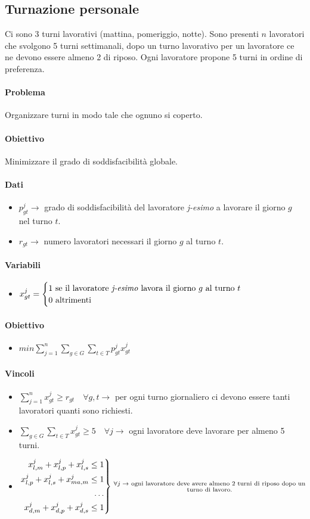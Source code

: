 \documentclass[12pt, twoside, letterpaper]{article}
\newenvironment{rcases}
  {\left.\begin{aligned}}
  {\end{aligned}\right\rbrace}
\newcommand{\problemai}[5]{
	#1
	\begin{dati}
		\paragraph{Dati} 
			\begin{itemize}
				#2
			\end{itemize}
	\end{dati}
	\begin{variabili}
		\paragraph{Variabili} 
			\begin{itemize}
				#3
			\end{itemize}
	\end{variabili}
	\begin{obiettivo}
		\paragraph{Obiettivo} 
			\begin{itemize}
				#4
			\end{itemize}
	\end{obiettivo}
	\begin{vincoli}
		\paragraph{Vincoli}
			\begin{itemize}
				#5
			\end{itemize}
	\end{vincoli}
}
\begin{document}
		\subsection{Turnazione personale}
			
			\problemai{
				Ci sono 3 turni lavorativi (mattina, pomeriggio, notte). Sono presenti $n$ lavoratori che svolgono 5 turni settimanali, dopo un turno lavorativo per un lavoratore ce ne devono essere almeno 2 di riposo. Ogni lavoratore propone 5 turni in ordine di preferenza.
			
				\paragraph{Problema} Organizzare turni in modo tale che ognuno si coperto.
				\paragraph{Obiettivo} Minimizzare il grado di soddisfacibilità globale.
			}{
				\item $p_{gt}^j \rightarrow$ grado di soddisfacibilità del lavoratore \textit{j-esimo} a lavorare il giorno $g$ nel turno $t$.
				\item $r_{gt} \rightarrow$ numero lavoratori necessari il giorno $g$ al turno $t$.
			}{
				\item $x_{gt}^j = \begin{cases} \text{1 se il lavoratore \textit{j-esimo} lavora il giorno $g$ al turno $t$} \\ \text{0 altrimenti} \end{cases}$
			}{
				\item $min \sum_{j=1}^n \sum_{g \in G} \sum_{t \in T} p_{gt}^j x_{gt}^j$
			}{
				\item $\sum_{j=1}^n x_{gt}^j \geq r_{gt} \quad \forall g,t \rightarrow$ per ogni turno giornaliero ci devono essere tanti lavoratori quanti sono richiesti.
				\item $\sum_{g \in G} \sum_{t \in T} x_{gt}^j \geq 5 \quad \forall j \rightarrow$ ogni lavoratore deve lavorare per almeno 5 turni.	
				\item 	\begin{equation*}
							\begin{rcases}
								x_{l,m}^j + x_{l,p}^j + x_{l,s}^j \leq 1 \\
								x_{l,p}^j + x_{l,s}^j + x_{ma,m}^j \leq 1 \\
								\dots \\
								x_{d,m}^j + x_{d,p}^j + x_{d,s}^j \leq 1 \\
							\end{rcases}
							\substack{\text{ $\forall j \rightarrow$ ogni lavoratore deve avere almeno 2 turni di riposo dopo un } \\ \text{turno di lavoro.}}
						\end{equation*} 

			}
			
\end{document}
